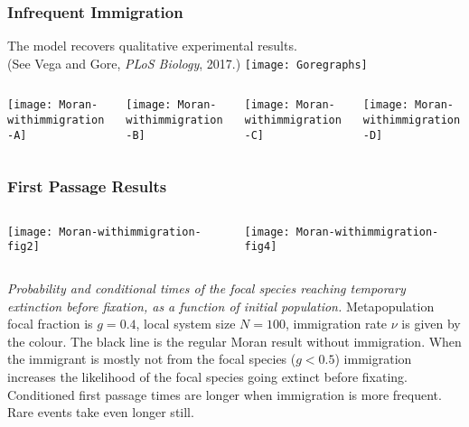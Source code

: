 \documentclass{beamer}
\begin{document}
\begin{frame}
\frametitle{Infrequent Immigration}
\centering
The model recovers qualitative experimental results. 
\\
(See Vega and Gore, \emph{PLoS Biology}, 2017.)
\texttt{[image: Goregraphs]}
\begin{columns}
\begin{column}{3cm}
\begin{center}
\texttt{[image: Moran-withimmigration-A]}
\end{center}
\end{column}
\begin{column}{3cm}
\begin{center}
\texttt{[image: Moran-withimmigration-B]}
\end{center}
\end{column}
\begin{column}{3cm}
\begin{center}
\texttt{[image: Moran-withimmigration-C]}
\end{center}
\end{column}
\begin{column}{3cm}
\begin{center}
\texttt{[image: Moran-withimmigration-D]}
\end{center}
\end{column}
\end{columns}
\end{frame}


\begin{frame}
\frametitle{First Passage Results}
\begin{columns}
\begin{column}{5.5cm}
\begin{center}
\texttt{[image: Moran-withimmigration-fig2]}
\end{center}
\end{column}
\begin{column}{5.5cm}
\begin{center}
\texttt{[image: Moran-withimmigration-fig4]}
\end{center}
\end{column}
\end{columns}
\justifying
\footnotesize{
\emph{Probability and conditional times of the focal species reaching temporary extinction before fixation, as a function of initial population.}
Metapopulation focal fraction is $g=0.4$, local system size $N=100$, immigration rate $\nu$ is given by the colour. 
The black line is the regular Moran result without immigration. 
When the immigrant is mostly not from the focal species ($g<0.5$) immigration increases the likelihood of the focal species going extinct before fixating. 
Conditioned first passage times are longer when immigration is more frequent. 
Rare events take even longer still. 
}
\end{frame}
\end{document}
